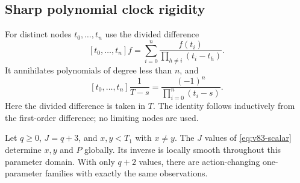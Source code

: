 \subsection{Sharp polynomial clock rigidity}
For distinct nodes $t_0,\ldots,t_n$ use the divided difference
\[
 [t_0,\ldots,t_n]f=\sum_{i=0}^n
             \frac{f(t_i)}{\prod_{h\ne i}(t_i-t_h)}.
\]
It annihilates polynomials of degree less than $n$, and
\begin{equation}\label{eq:v83-cauchy-dd}
 [t_0,\ldots,t_n]\frac1{T-s}
       =\frac{(-1)^n}{\prod_{i=0}^n(t_i-s)}.
\end{equation}
Here the divided difference is taken in $T$. The identity follows
inductively from the first-order difference; no limiting nodes are used.

\begin{theorem}\label{thm:v83-scalar}
Let $q\ge0$, $J=q+3$, and $x,y<T_1$ with $x\ne y$. The $J$ values
of \eqref{eq:v83-scalar} determine $x,y$ and $P$ globally. Its inverse
is locally smooth throughout this parameter domain. With only $q+2$
values, there are action-changing one-parameter families with exactly
the same observations.
\end{theorem}
